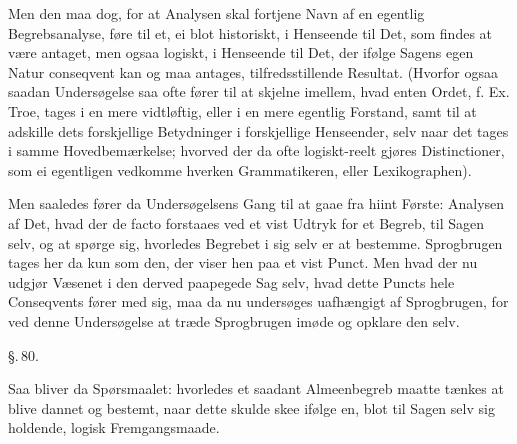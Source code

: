 \documentclass[12pt]{book}
\def\textit#1{#1}%
\def\emph#1{#1}%
\newcommand{\parag}[1]{%
  \par\vspace{0.9\baselineskip}%
  {\centering\textit{\S.\,#1.}\par}%
  \vspace{0.35\baselineskip}%
  \noindent\hspace{\parindent}\ignorespaces
}
\newcommand{\opage}[1]{\marginnote{\footnotesize\textit{[#1]}}}
\begin{document}
Men den maa dog, for at Analysen skal fortjene Navn af en egentlig
Begrebsanalyse, føre til et, ei blot historiskt, i Henseende til Det, som findes
at være antaget, men ogsaa logiskt, i Henseende til Det, der ifølge Sagens egen
Natur conseqvent kan og maa antages, tilfredsstillende Resultat. (Hvorfor ogsaa
saadan Undersøgelse saa ofte fører til at skjelne imellem, hvad enten Ordet,
f. Ex. \emph{Troe}, tages i en mere vidtløftig, eller i en mere egentlig Forstand,
samt til at adskille dets forskjellige Betydninger i forskjellige Henseender,
selv naar det tages i samme Hovedbemærkelse; hvorved der da ofte logiskt-reelt
gjøres Distinctioner, som ei egentligen vedkomme hverken Grammatikeren, eller
Lexikographen).

Men saaledes fører da Undersøgelsens Gang til at gaae fra hiint Første: Analysen
af Det, hvad der \textit{de facto} forstaaes ved et vist Udtryk for et Begreb,
til Sagen selv, og at spørge sig, hvorledes Begrebet i sig selv er at bestemme.
Sprogbrugen tages her da kun som den, der viser
\opage{214} hen paa et vist Punct. Men hvad der nu udgjør Væsenet i den derved paapegede
Sag selv, hvad dette Puncts hele Conseqvents fører med sig, maa da nu undersøges
uafhængigt af Sprogbrugen, for ved denne Undersøgelse at træde Sprogbrugen imøde
og opklare den selv.

\parag{80}
Saa bliver da Spørsmaalet: hvorledes et saadant Almeenbegreb maatte tænkes at
blive dannet og bestemt, naar dette skulde skee ifølge en, blot til Sagen selv
sig holdende, logisk Fremgangsmaade.
\end{document}
